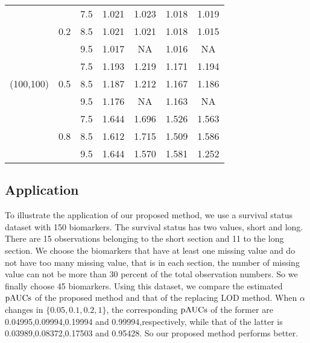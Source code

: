 \documentclass[a4,11pt,epsf, amssymb]{article}
\begin{document}
\begin{table}[htbp]
\begin{tabular}{c|cccccc}
    \hline
    \multirow{9}[6]{*}{(100,100)} & \multirow{3}[2]{*}{0.2} & 7.5   & 1.021  & 1.023  & 1.018  & 1.019  \\
          &       & 8.5   & 1.021  & 1.021  & 1.018  & 1.015  \\
          &       & 9.5   & 1.017  & NA    & 1.016  & NA \\
\cline{2-7}          & \multirow{3}[2]{*}{0.5} & 7.5   & 1.193  & 1.219  & 1.171  & 1.194  \\
          &       & 8.5   & 1.187  & 1.212  & 1.167  & 1.186  \\
          &       & 9.5   & 1.176  & NA    & 1.163  & NA \\
\cline{2-7}          & \multirow{3}[2]{*}{0.8} & 7.5   & 1.644  & 1.696  & 1.526  & 1.563  \\
          &       & 8.5   & 1.612  & 1.715  & 1.509  & 1.586  \\
          &       & 9.5   & 1.644  & 1.570  & 1.581  & 1.252  \\
    \hline
    \end{tabular}%
  \label{tab:addlabel}%
\end{table}%

\subsection{Application}
To illustrate the application of our proposed method, we use a survival status dataset with 150 biomarkers. The survival status has two values, short and long. There are 15 observations belonging to the short section and 11 to the long section. We choose the biomarkers that have at least one missing value and do not have too many missing value, that is in each section, the number of missing value can not be more than 30 percent of the total observation numbers. So we finally choose 45 biomarkers. Using this dataset, we compare the estimated $\hbox {pAUCs}$ of the proposed method and that of the replacing LOD method. When $\alpha$ changes in $\{0.05,0.1,0.2,1\}$, the corresponding $\hbox {pAUCs}$ of the former are 0.04995,0.09994,0.19994 and 0.99994,respectively, while that of the latter is 0.03989,0.08372,0.17503 and 0.95428. So our proposed method performs better.
\end{document}
